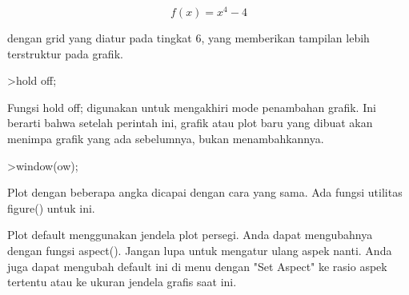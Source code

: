 \documentclass[a4paper,10pt]{article}
\begin{document}
\begin{eulernotebook}
\begin{eulercomment}
\end{eulercomment}
\begin{eulerformula}
\[
f(x)=x^{4}-4
\]
\end{eulerformula}
\begin{eulercomment}
dengan grid yang diatur pada tingkat 6, yang memberikan tampilan lebih
terstruktur pada grafik.
\end{eulercomment}
\begin{eulerprompt}
>hold off;
\end{eulerprompt}
\begin{eulercomment}
Fungsi hold off; digunakan untuk mengakhiri mode penambahan grafik.
Ini berarti bahwa setelah perintah ini, grafik atau plot baru yang
dibuat akan menimpa grafik yang ada sebelumnya, bukan menambahkannya.
\end{eulercomment}
\begin{eulerprompt}
>window(ow);
\end{eulerprompt}
\begin{eulercomment}
Plot dengan beberapa angka dicapai dengan cara yang sama. Ada fungsi
utilitas figure() untuk ini.

\end{eulercomment}
\begin{eulercomment}
Plot default menggunakan jendela plot persegi. Anda dapat mengubahnya
dengan fungsi aspect(). Jangan lupa untuk mengatur ulang aspek nanti.
Anda juga dapat mengubah default ini di menu dengan "Set Aspect" ke
rasio aspek tertentu atau ke ukuran jendela grafis saat ini.


\end{eulercomment}
\end{eulernotebook}
\end{document}
